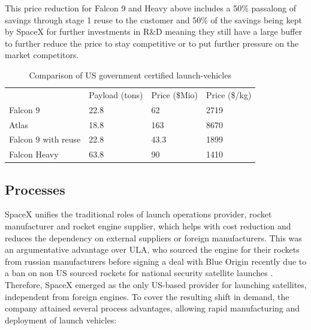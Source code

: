 \documentclass[11pt,a4paper]{article}
\begin{document}
This price reduction for Falcon 9 and Heavy above includes a 50\% passalong of savings through stage 1 reuse to the customer and 50\% of the savings being kept by SpaceX for further investments in R&D meaning they still have a large buffer to further reduce the price to stay competitive or to put further pressure on the market competitors.
\cite{scs15}

\begin{table}[]
\renewcommand{\arraystretch}{1.3}
\begin{tabular}{l|l|l|l}
    \hline
                                 & Payload (tons) & Price (\$Mio) & Price (\$/kg) \\
Falcon 9                         & 22.8           & 62            & 2719          \\
Atlas                            & 18.8           & 163           & 8670          \\
Falcon 9 with reuse              & 22.8           & 43.3          & 1899          \\
Falcon Heavy                     & 63.8           & 90            & 1410 \\
\hline
\end{tabular}
\centering
\caption{Comparison of US government certified launch-vehicles \cite{scs24, scs15, scs20}}
\label{table}
\end{table}

\subsection{Processes}\label{processesn}
SpaceX unifies the traditional roles of launch operations provider, rocket manufacturer and rocket engine supplier, which helps with cost reduction and reduces the dependency on external suppliers or foreign manufacturers. This was an argumentative advantage over ULA, who sourced the engine for their rockets from russian manufacturers before signing a deal with Blue Origin recently due to a ban on non US sourced rockets for national security satellite launches \cite{scs31}. Therefore, SpaceX emerged as the only US-based provider for launching satellites, independent from foreign engines. To cover the resulting shift in demand, the company attained several process advantages, allowing rapid manufacturing and deployment of launch vehicles:
\end{document}
